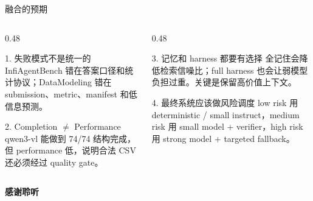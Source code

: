 \documentclass[aspectratio=169,UTF8]{ctexbeamer}
\begin{document}
\begin{frame}{融合的预期}
\small
\begin{columns}[T]
\begin{column}{0.48\textwidth}
\begin{block}{1. 失败模式不是统一的}
InfiAgentBench 错在答案口径和统计协议；DataModeling 错在 submission、metric、manifest 和低信息预测。
\end{block}
\begin{block}{2. Completion \(\neq\) Performance}
qwen3-vl 能做到 74/74 结构完成，但 performance 低，说明合法 CSV 还必须经过 quality gate。
\end{block}
\end{column}
\begin{column}{0.48\textwidth}
\begin{block}{3. 记忆和 harness 都要有选择}
全记住会降低检索信噪比；full harness 也会让弱模型负担过重。关键是保留高价值上下文。
\end{block}
\begin{block}{4. 最终系统应该做风险调度}
low risk 用 deterministic / small instruct，medium risk 用 small model + verifier，high risk 用 strong model + targeted fallback。
\end{block}
\end{column}
\end{columns}
\end{frame}

\begin{frame}
\vspace{2.4em}
\begin{center}
{\Huge\textbf{感谢聆听}}
\end{center}
\end{frame}
\end{document}
